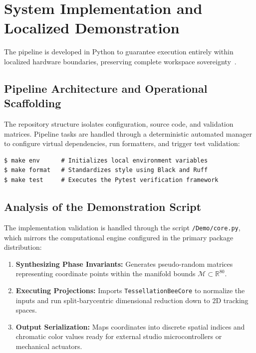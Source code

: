 
\section{System Implementation and Localized Demonstration}
\label{sec:implementation}

The pipeline is developed in Python to guarantee execution entirely within localized hardware boundaries, preserving complete workspace sovereignty~\cite{higham2002accuracy}.

\subsection{Pipeline Architecture and Operational Scaffolding}

The repository structure isolates configuration, source code, and validation matrices. Pipeline tasks are handled through a deterministic automated manager to configure virtual dependencies, run formatters, and trigger test validation:

\begin{verbatim}
$ make env      # Initializes local environment variables
$ make format   # Standardizes style using Black and Ruff
$ make test     # Executes the Pytest verification framework
\end{verbatim}

\subsection{Analysis of the Demonstration Script}

The implementation validation is handled through the script \texttt{/Demo/core.py}, which mirrors the computational engine configured in the primary package distribution:

\begin{enumerate}
    \item \textbf{Synthesizing Phase Invariants:} Generates pseudo-random matrices representing coordinate points within the manifold bounds $\mathcal{M} \subset \mathbb{R}^{80}$.
    \item \textbf{Executing Projections:} Imports \texttt{TessellationBeeCore} to normalize the inputs and run split-barycentric dimensional reduction down to $2$D tracking spaces.
    \item \textbf{Output Serialization:} Maps coordinates into discrete spatial indices and chromatic color values ready for external studio microcontrollers or mechanical actuators.
\end{enumerate}

